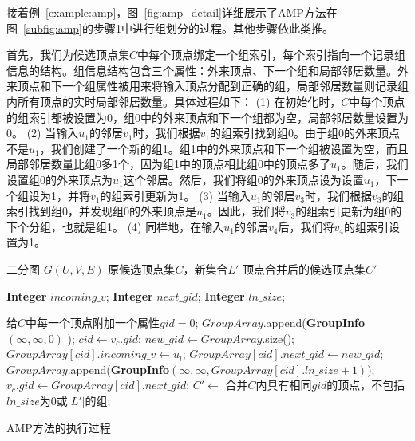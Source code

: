 \begin{example}
  接着例~\ref{example:amp}，图~\ref{fig:amp_detail}详细展示了AMP方法在图~\ref{subfig:amp}的步骤\Num1中进行组划分的过程。其他步骤依此类推。

  首先，我们为候选顶点集$C$中每个顶点绑定一个组索引，每个索引指向一个记录组信息的结构。组信息结构包含三个属性：外来顶点、下一个组和局部邻居数量。外来顶点和下一个组属性被用来将输入顶点分配到正确的组，局部邻居数量则记录组内所有顶点的实时局部邻居数量。具体过程如下：
  (1) 在初始化时，$C$中每个顶点的组索引都被设置为0，组0中的外来顶点和下一个组都为空，局部邻居数量设置为0。
  (2) 当输入$u_1$的邻居$v_1$时，我们根据$v_1$的组索引找到组0。由于组0的外来顶点不是$u_1$，我们创建了一个新的组1。组1中的外来顶点和下一个组被设置为空，而且局部邻居数量比组0多1个，因为组1中的顶点相比组0中的顶点多了$u_1$。随后，我们设置组0的外来顶点为$u_1$	​这个邻居。然后，我们将组0的外来顶点设为设置$u_1$，下一个组设为1，并将$v_1$的组索引更新为1。
  (3) 当输入$u_1$的邻居$v_3$时，我们根据$v_3$的组索引找到组0，并发现组0的外来顶点是$u_1$。因此，我们将$v_3$的组索引更新为组0的下个分组，也就是组1。
  (4) 同样地，在输入$u_1$的邻居$v_4$后，我们将$v_4$的组索引设置为1。
  
\end{example}





\begin{algorithm}[t]
  \begin{algorithmic}[1]
    \normalsize
    \renewcommand{\algorithmicrequire}{\textbf{数据:}}
    \REQUIRE 二分图 $G(U,V,E)$
    \renewcommand{\algorithmicrequire}{\textbf{输入:}}
    \REQUIRE 原候选顶点集$C$，新集合$L'$
    \ENSURE 顶点合并后的候选顶点集$C'$
    
    \renewcommand{\algorithmicwhile}{\textbf{struct}}
    \renewcommand{\algorithmicdo}{\textbf{:}}
      \STATE \textbf{Integer} $incoming\_v$;
      \STATE \textbf{Integer} $next\_gid$;
      \STATE \textbf{Integer} $ln\_size$;
    \ENDWHILE


    \renewcommand{\algorithmicwhile}{\textbf{procedure}}
    \renewcommand{\algorithmicdo}{\textbf{do}}


    \STATE 给$C$中每一个顶点附加一个属性$gid=0$;
    \STATE $GroupArray$\textsf{.append}(\textbf{GroupInfo}$(\infty, \infty, 0)$ );
        \STATE $cid \leftarrow v_c.gid$;
          \STATE $new\_gid \leftarrow GroupArray$\textsf{.size()};
          \STATE $GroupArray[cid].incoming\_v \leftarrow u_l$;
          \STATE $GroupArray[cid].next\_gid \leftarrow new\_gid$;
          \STATE $GroupArray$\textsf{.append}(\textbf{GroupInfo$(\infty, \infty, GroupArray[cid].ln\_size + 1)$});
        \ENDIF
      \STATE $v_c.gid\leftarrow GroupArray[cid].next\_gid$; 
      \ENDFOR
    \ENDFOR
    \STATE $C'\leftarrow$ 合并$C$内具有相同$gid$的顶点，不包括$ln\_size$为0或$|L'|$的组;

    \ENDWHILE

  \end{algorithmic}
  \caption{\label{alg:amp}AMP方法的执行过程}
\end{algorithm}

